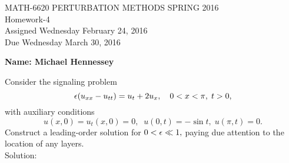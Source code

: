 
\pagestyle{empty}


\begin{center}
\large{ MATH-6620 \hspace{1in}  PERTURBATION METHODS \hspace{1in}SPRING 2016\\ Homework-4 \\ Assigned Wednesday February 24, 2016 \\ Due Wednesday March 30, 2016}\end{center}

\vspace{6 ex}

{\bf Name: Michael Hennessey} \hfill

\vspace{6 ex}

 \ec

\benum

\item Consider the signaling problem
\begin{equation*}
\epsilon(u_{xx} - u_{tt}) = u_t + 2 u_x, \quad 0<x<\pi, \; t>0,
\end{equation*}
with auxiliary conditions
\begin{equation*}
u(x,0) = u_t(x,0) = 0, \;\; u(0,t) = -\sin t, \; u(\pi,t) = 0.
\end{equation*}
Construct a leading-order solution for $0 < \epsilon \ll 1,$ paying due attention to the location of any layers.\\

Solution:\\


